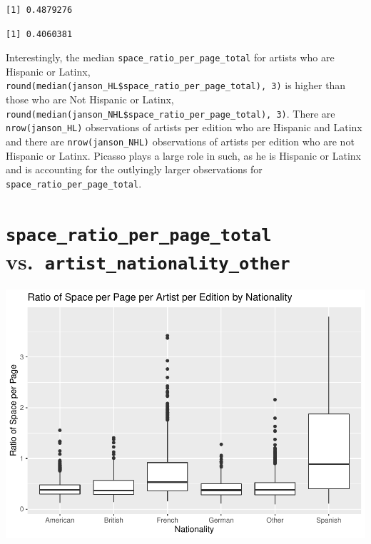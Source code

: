 \documentclass[
  letterpaper,
  DIV=11,
  numbers=noendperiod]{scrreprt}
\begin{document}
\begin{verbatim}
[1] 0.4879276
\end{verbatim}

\begin{verbatim}
[1] 0.4060381
\end{verbatim}

Interestingly, the median \texttt{space\_ratio\_per\_page\_total} for
artists who are Hispanic or Latinx,
\texttt{round(median(janson\_HL\$space\_ratio\_per\_page\_total),\ 3)}
is higher than those who are Not Hispanic or Latinx,
\texttt{round(median(janson\_NHL\$space\_ratio\_per\_page\_total),\ 3)}.
There are \texttt{nrow(janson\_HL)} observations of artists per edition
who are Hispanic and Latinx and there are \texttt{nrow(janson\_NHL)}
observations of artists per edition who are not Hispanic or Latinx.
Picasso plays a large role in such, as he is Hispanic or Latinx and is
accounting for the outlyingly larger observations for
\texttt{space\_ratio\_per\_page\_total}.

\hypertarget{space_ratio_per_page_total-vs.-artist_nationality_other}{%
\section{\texorpdfstring{\texttt{space\_ratio\_per\_page\_total}
vs.~\texttt{artist\_nationality\_other}}{space\_ratio\_per\_page\_total vs.~artist\_nationality\_other}}\label{space_ratio_per_page_total-vs.-artist_nationality_other}}

\includegraphics{Chapter1/Chapter1_files/figure-pdf/nationalityotherallbooks-1.pdf}

\hypertarget{section}{%
\section{}\label{section}}
\end{document}
